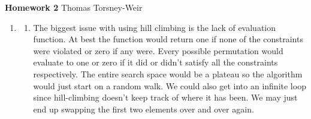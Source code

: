 \documentclass[10pt]{article}
\begin{document}
{\bf Homework 2} \hfill {\raggedleft Thomas Torsney-Weir}

\begin{enumerate}
\item %
  \begin{enumerate}
  \item %
    The biggest issue with using hill climbing is the lack of evaluation
    function.  At best the function would return one if none of the 
    constraints were violated or zero if any were.  Every possible 
    permutation would evaluate to one or zero if it did or didn't satisfy
    all the constraints respectively.  The entire search space would be a
    plateau so the algorithm would just start on a random walk.  We could 
    also get into an infinite loop since hill-climbing doesn't keep track 
    of where it has been.  We may just end up swapping the first two 
    elements over and over again.
    

\end{enumerate}
\end{enumerate}
\end{document}
